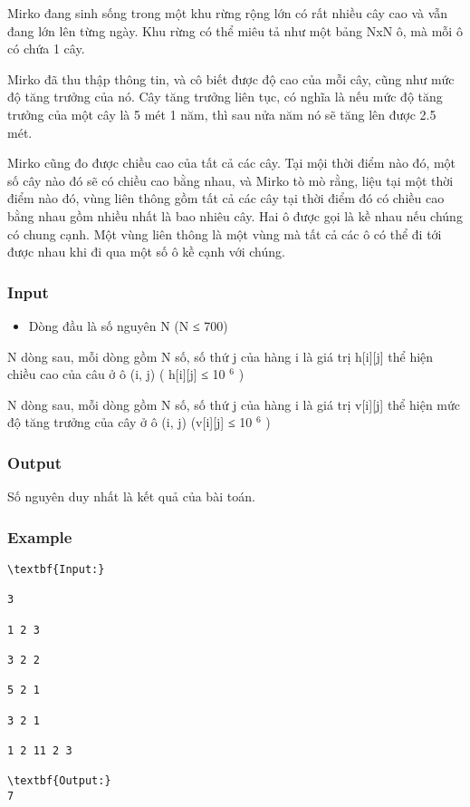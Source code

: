



   Mirko đang sinh sống trong một khu rừng rộng lớn có rất nhiều cây cao và vẫn đang lớn lên từng ngày. Khu rừng có thể miêu tả như một bảng NxN ô, mà mỗi ô có chứa 1 cây.  

   Mirko đã thu thập thông tin, và cô biết được độ cao của mỗi cây, cũng như mức độ tăng trưởng của nó. Cây tăng trưởng liên tục, có nghĩa là nếu mức độ tăng trưởng của một cây là 5 mét 1 năm, thì sau nửa năm nó sẽ tăng lên được 2.5 mét.  

   Mirko cũng đo được chiều cao của tất cả các cây. Tại mội thời điểm nào đó, một số cây nào đó sẽ có chiều cao bằng nhau, và Mirko tò mò rằng, liệu tại một thời điểm nào đó, vùng liên thông gồm tất cả các cây tại thời điểm đó có chiều cao bằng nhau gồm nhiều nhất là bao nhiêu cây. Hai ô được gọi là kề nhau nếu chúng có chung cạnh. Một vùng liên thông là một vùng mà tất cả các ô có thể đi tới được nhau khi đi qua một số ô kề cạnh với chúng.  

\subsubsection{   Input  }


\begin{itemize}
	\item     Dòng đầu là số nguyên N (N ≤ 700)   
\end{itemize}

   N dòng sau, mỗi dòng gồm N số, số thứ j của hàng i là giá trị h[i][j] thể hiện chiều cao của câu ở ô (i, j) ( h[i][j] ≤ 10   $^    6   $   )  

   N dòng sau, mỗi dòng gồm N số, số thứ j của hàng i là giá trị v[i][j] thể hiện mức độ tăng trưởng của cây ở ô (i, j) (v[i][j] ≤ 10   $^    6   $   )  

\subsubsection{   Output  }

   Số nguyên duy nhất là kết quả của bài toán.  

\subsubsection{   Example  }
\begin{verbatim}
\textbf{Input:}

3

1 2 3

3 2 2

5 2 1

3 2 1

1 2 11 2 3

\textbf{Output:}
7\end{verbatim}